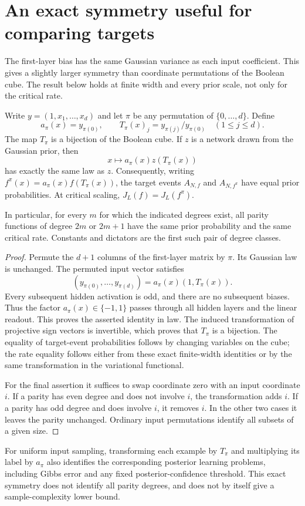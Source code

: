 \section{An exact symmetry useful for comparing targets}
\label{sec:projective-cube-symmetry}

The first-layer bias has the same Gaussian variance as each input
coefficient. This gives a slightly larger symmetry than coordinate
permutations of the Boolean cube. The result below holds at finite width
and every prior scale, not only for the critical rate.

\begin{proposition}
\label{prop:projective-cube-symmetry}
Write $y=(1,x_1,\ldots,x_d)$ and let $\pi$ be any permutation of
$\{0,\ldots,d\}$. Define
\[
 a_\pi(x)=y_{\pi(0)},\qquad
 T_\pi(x)_j=y_{\pi(j)}/y_{\pi(0)}\quad(1\le j\le d).
\]
The map $T_\pi$ is a bijection of the Boolean cube. If $z$ is a network
drawn from the Gaussian prior, then
\[
 x\longmapsto a_\pi(x)z(T_\pi(x))
\]
has exactly the same law as $z$. Consequently, writing
$f^\pi(x)=a_\pi(x)f(T_\pi(x))$, the target events $A_{N,f}$ and
$A_{N,f^\pi}$ have equal prior probabilities. At critical scaling,
$J_L(f)=J_L(f^\pi)$.

In particular, for every $m$ for which the indicated degrees exist,
all parity functions of degree $2m$ or $2m+1$ have the same prior
probability and the same critical rate. Constants and dictators are the
first such pair of degree classes.
\end{proposition}

\begin{proof}
Permute the $d+1$ columns of the first-layer matrix by $\pi$. Its
Gaussian law is unchanged. The permuted input vector satisfies
\[
 (y_{\pi(0)},\ldots,y_{\pi(d)})
       =a_\pi(x)(1,T_\pi(x)).
\]
Every subsequent hidden activation is odd, and there are no subsequent
biases. Thus the factor $a_\pi(x)\in\{-1,1\}$ passes through all hidden
layers and the linear readout. This proves the asserted identity in
law. The induced transformation of projective sign vectors is
invertible, which proves that $T_\pi$ is a bijection. The equality of
target-event probabilities follows by changing variables on the cube;
the rate equality follows either from these exact finite-width
identities or by the same transformation in the variational functional.

For the final assertion it suffices to swap coordinate zero with an
input coordinate $i$. If a parity has even degree and does not involve
$i$, the transformation adds $i$. If a parity has odd degree and does
involve $i$, it removes $i$. In the other two cases it leaves the parity
unchanged. Ordinary input permutations identify all subsets of a given
size.
\end{proof}

For uniform input sampling, transforming each example by $T_\pi$ and
multiplying its label by $a_\pi$ also identifies the corresponding
posterior learning problems, including Gibbs error and any fixed
posterior-confidence threshold. This exact symmetry does not identify
all parity degrees, and does not by itself give a sample-complexity
lower bound.
